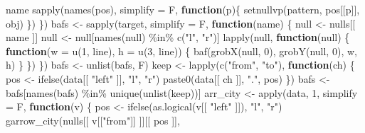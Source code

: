 \documentclass[
]{article}
\newenvironment{Shaded}{\begin{snugshade}}{\end{snugshade}}
\newcommand{\AttributeTok}[1]{\textcolor[rgb]{0.77,0.63,0.00}{#1}}
\newcommand{\ControlFlowTok}[1]{\textcolor[rgb]{0.13,0.29,0.53}{\textbf{#1}}}
\newcommand{\DecValTok}[1]{\textcolor[rgb]{0.00,0.00,0.81}{#1}}
\newcommand{\FunctionTok}[1]{\textcolor[rgb]{0.00,0.00,0.00}{#1}}
\newcommand{\NormalTok}[1]{#1}
\newcommand{\OtherTok}[1]{\textcolor[rgb]{0.56,0.35,0.01}{#1}}
\newcommand{\SpecialCharTok}[1]{\textcolor[rgb]{0.00,0.00,0.00}{#1}}
\newcommand{\StringTok}[1]{\textcolor[rgb]{0.31,0.60,0.02}{#1}}
\begin{document}
\begin{Shaded}
\begin{Highlighting}[]
\NormalTok{            name}
        \FunctionTok{sapply}\NormalTok{(}\FunctionTok{names}\NormalTok{(pos), }\AttributeTok{simplify =}\NormalTok{ F,}
          \ControlFlowTok{function}\NormalTok{(p)\{}
            \FunctionTok{setnullvp}\NormalTok{(pattern, pos[[p]], obj)}
\NormalTok{          \})}
\NormalTok{      \})}
\NormalTok{    bafs }\OtherTok{\textless{}{-}} \FunctionTok{sapply}\NormalTok{(target, }\AttributeTok{simplify =}\NormalTok{ F,}
      \ControlFlowTok{function}\NormalTok{(name) \{}
\NormalTok{        null }\OtherTok{\textless{}{-}}\NormalTok{ nulls[[ name ]]}
\NormalTok{        null }\OtherTok{\textless{}{-}}\NormalTok{ null[}\FunctionTok{names}\NormalTok{(null) }\SpecialCharTok{\%in\%} \FunctionTok{c}\NormalTok{(}\StringTok{"l"}\NormalTok{, }\StringTok{"r"}\NormalTok{)]}
        \FunctionTok{lapply}\NormalTok{(null, }\ControlFlowTok{function}\NormalTok{(null) \{}
          \ControlFlowTok{function}\NormalTok{(}\AttributeTok{w =} \FunctionTok{u}\NormalTok{(}\DecValTok{1}\NormalTok{, line), }\AttributeTok{h =} \FunctionTok{u}\NormalTok{(}\DecValTok{3}\NormalTok{, line)) \{}
            \FunctionTok{baf}\NormalTok{(}\FunctionTok{grobX}\NormalTok{(null, }\DecValTok{0}\NormalTok{), }\FunctionTok{grobY}\NormalTok{(null, }\DecValTok{0}\NormalTok{), w, h)}
\NormalTok{          \}}
\NormalTok{          \})}
\NormalTok{      \})}
\NormalTok{    bafs }\OtherTok{\textless{}{-}} \FunctionTok{unlist}\NormalTok{(bafs, F)}
\NormalTok{    keep }\OtherTok{\textless{}{-}} \FunctionTok{lapply}\NormalTok{(}\FunctionTok{c}\NormalTok{(}\StringTok{"from"}\NormalTok{, }\StringTok{"to"}\NormalTok{),}
      \ControlFlowTok{function}\NormalTok{(ch) \{}
\NormalTok{        pos }\OtherTok{\textless{}{-}} \FunctionTok{ifelse}\NormalTok{(data[[ }\StringTok{"left"}\NormalTok{ ]], }\StringTok{"l"}\NormalTok{, }\StringTok{"r"}\NormalTok{)}
        \FunctionTok{paste0}\NormalTok{(data[[ ch ]], }\StringTok{"."}\NormalTok{, pos)}
\NormalTok{      \})}
\NormalTok{    bafs }\OtherTok{\textless{}{-}}\NormalTok{ bafs[}\FunctionTok{names}\NormalTok{(bafs) }\SpecialCharTok{\%in\%} \FunctionTok{unique}\NormalTok{(}\FunctionTok{unlist}\NormalTok{(keep))]}
\NormalTok{    arr\_city }\OtherTok{\textless{}{-}} \FunctionTok{apply}\NormalTok{(data, }\DecValTok{1}\NormalTok{, }\AttributeTok{simplify =}\NormalTok{ F,}
      \ControlFlowTok{function}\NormalTok{(v) \{}
\NormalTok{        pos }\OtherTok{\textless{}{-}} \FunctionTok{ifelse}\NormalTok{(}\FunctionTok{as.logical}\NormalTok{(v[[ }\StringTok{"left"}\NormalTok{ ]]), }\StringTok{"l"}\NormalTok{, }\StringTok{"r"}\NormalTok{)}
        \FunctionTok{garrow\_city}\NormalTok{(nulls[[ v[[}\StringTok{"from"}\NormalTok{]] ]][[ pos ]],}

\end{Highlighting}
\end{Shaded}
\end{document}
